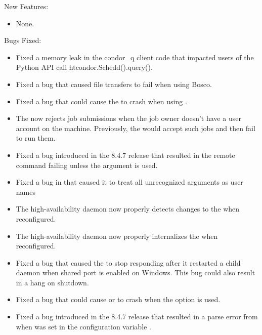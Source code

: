 \noindent New Features:

\begin{itemize}

\item None.

\end{itemize}

\noindent Bugs Fixed:

\begin{itemize}

\item Fixed a memory leak in the condor\_q client code that impacted
users of the Python API call htcondor.Schedd().query().

\item Fixed a bug that caused file transfers to fail when using Bosco.

\item Fixed a bug that could cause the  to crash when using
.

\item The  now rejects job submissions when the job owner
doesn't have a user account on the machine.
Previously, the  would accept such jobs and then fail
to run them.

\item Fixed a bug introduced in the 8.4.7 release that resulted in the remote
 command failing unless the  argument is used.

\item Fixed a bug in  that caused it to treat all unrecognized arguments
as user names

\item The high-availability daemon now properly detects changes to the
 when reconfigured.

\item The high-availability daemon now properly internalizes the
 when reconfigured.

\item Fixed a bug that caused the  to stop responding after it
restarted a child daemon when shared port is enabled on Windows. This bug could also
result in a hang on shutdown.

\item Fixed a bug that could cause  or  to
crash when the  option is used.

\item Fixed a bug introduced in the 8.4.7 release that resulted in a parse error from 
when  was set in the configuration variable .

\end{itemize}

